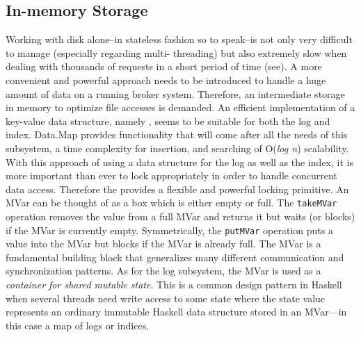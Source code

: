 

\subsection{In-memory Storage}
\label{subsec:broker-log-inmemory}

Working with disk alone--in stateless fashion so to speak--is not only very
difficult to manage (especially regarding multi- threading) but also extremely
slow when dealing with thousands of requests in a short period of time (see). A
more convenient and powerful approach needs to be introduced to handle a huge
amount of data on a running broker system. Therefore, an intermediate storage
in memory to optimize file accesses is demanded. An
efficient implementation of a key-value data structure, namely
,
seems to be suitable for both the log and index. Data.Map provides functionality
that will come after all the needs of this subsystem, a time complexity for
insertion, and searching of O(\textit{log n}) scalability. \\

With this approach of using a data structure for the log as well as the index,
it is more important than ever to lock appropriately in order to handle
concurrent data access. Therefore the
provides a flexible and powerful locking primitive. An MVar can be thought of as
a box which is either empty or full.  The \lstinline{takeMVar} operation removes
the value from a full MVar and returns it but waits (or blocks) if the MVar is
currently empty.  Symmetrically, the \lstinline{putMVar} operation puts a value
into the MVar but blocks if the MVar is already full.  The MVar is a fundamental
building block that generalizes many different communication and synchronization
patterns. As for the log subsystem, the MVar is used as a \textit{container for
shared mutable state}. This is a common design pattern in Haskell when several
threads need write access to some state where the state value represents an
ordinary immutable Haskell data structure stored in an MVar---in this case a map
of logs or indices. \cite{marlow2013parallel}

